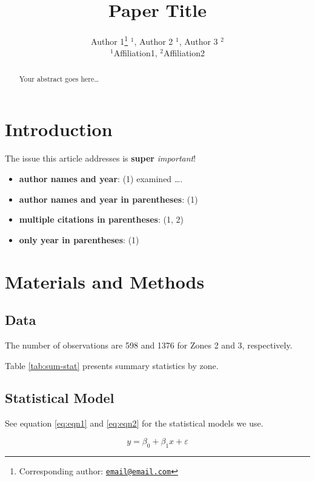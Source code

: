 \documentclass[
  12pt,
]{article}
\title{Paper Title}
\author{Author 1\footnote{Corresponding author: \href{mailto:email@email.com}{\nolinkurl{email@email.com}}} \(^1\), Author 2 \(^1\), Author 3 \(^2\)\\
\(^1\)Affiliation1, \(^2\)Affiliation2}
\date{}
\begin{document}
\maketitle
\begin{abstract}
Your abstract goes here\ldots{}
\end{abstract}

\hypertarget{introduction}{%
\section{Introduction}\label{introduction}}

The issue this article addresses is \textbf{super} \emph{important}!

\begin{itemize}
\item
  \textbf{author names and year}: (1) examined \ldots.
\item
  \textbf{author names and year in parentheses}: (1)
\item
  \textbf{multiple citations in parentheses}: (1, 2)
\item
  \textbf{only year in parentheses}: (1)
\end{itemize}

\newpage

\hypertarget{materials-and-methods}{%
\section{Materials and Methods}\label{materials-and-methods}}

\hypertarget{data}{%
\subsection{Data}\label{data}}

The number of observations are 598 and 1376 for Zones 2 and 3, respectively.

Table \ref{tab:sum-stat} presents summary statistics by zone.

\hypertarget{statistical-model}{%
\subsection{Statistical Model}\label{statistical-model}}

See equation \eqref{eq:eqn1} and \eqref{eq:eqn2} for the statistical models we use.

\begin{equation}
y = \beta_0 + \beta_1 x + \varepsilon
\label{eq:eqn1}
\end{equation}
\end{document}
